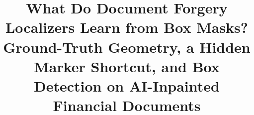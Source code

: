 \documentclass[conference]{IEEEtran}
\begin{document}
\title{What Do Document Forgery Localizers Learn from Box Masks?\\Ground-Truth Geometry, a Hidden Marker Shortcut, and Box Detection on AI-Inpainted Financial Documents}

\author{
}

\maketitle











\end{document}
